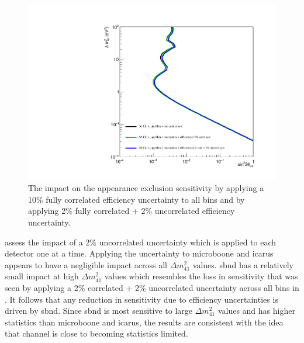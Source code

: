 \begin{figure}[h!]
    \centering
    \includegraphics[width = \largefigwidth]{figures-chap6/exclusion_contours/efficiency_systematics/nue_app_cor_uncor.pdf}
    \caption[Impact of correlated and uncorrelated efficiency systematics on the \nue appearance sensitivity.]{The impact on the \nue appearance exclusion sensitivity by applying a 10\% fully correlated efficiency uncertainty to all bins and by applying 2\% fully correlated + 2\% uncorrelated efficiency uncertainty.}
    \label{fig:nue_app_corr_uncorr_error}
\end{figure}

 assess the impact of a 2\% uncorrelated uncertainty which is applied to each detector one at a time. Applying the uncertainty to \gls{microboone} and \gls{icarus} appears to have a negligible impact across all $\Delta m^2_{41}$ values. \gls{sbnd} has a relatively small impact at high $\Delta m^2_{41}$ values which resembles the loss in sensitivity that was seen by applying a 2\% correlated + 2\% uncorrelated uncertainty across all bins in . It follows that any reduction in sensitivity due to efficiency uncertainties is driven by \gls{sbnd}. Since \gls{sbnd} is most sensitive to large $\Delta m^2_{41}$ values and has higher statistics than \gls{microboone} and \gls{icarus}, the results are consistent with the idea that \nue channel is close to becoming statistics limited. 

